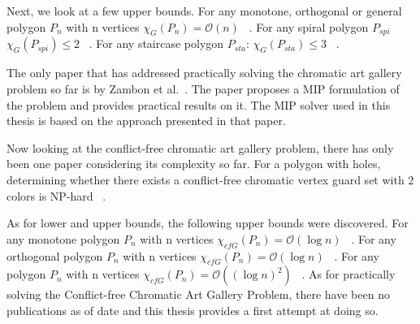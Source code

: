 Next, we look at a few upper bounds.
For any monotone, orthogonal or general polygon $P_n$ with n vertices $\chi_G(P_n) = \mathcal{O}(n)$ ~\cite{bartschi2011coloring}.
For any spiral polygon $P_{spi}$ $\chi_G(P_{spi}) \leq 2$ ~\cite{erickson2012art}.
For any staircase polygon $P_{sta}$: $\chi_G(P_{sta}) \leq 3$ ~\cite{erickson2012art}.\par\noindent
The only paper that has addressed practically solving the chromatic art gallery problem so far is by Zambon et al.~\cite{zambon2014exact}. The paper proposes a MIP formulation of the problem and provides practical results on it. The MIP solver used in this thesis is based on the approach presented in that paper.\par\noindent
Now looking at the conflict-free chromatic art gallery problem, there has only been one paper considering its complexity so far.
For a polygon with holes, determining whether there exists a conflict-free chromatic vertex guard set with $2$ colors is NP-hard ~\cite{iwamoto2022vertex}.\par\noindent
As for lower and upper bounds, the following upper bounds were discovered.
For any monotone polygon $P_n$ with n vertices $\chi_{cfG}(P_n) = \mathcal{O}(\log n)$ ~\cite{bartschi2011coloring}.
For any orthogonal polygon $P_n$ with n vertices $\chi_{cfG}(P_n) = \mathcal{O}(\log n)$ ~\cite{bartschi2011coloring}.
For any polygon $P_n$ with n vertices $\chi_{cfG}(P_n) = \mathcal{O}((\log n)^2)$ ~\cite{bartschi2011coloring}.
As for practically solving the Conflict-free Chromatic Art Gallery Problem, there have been no publications as of date and this thesis provides a first attempt at doing so.

